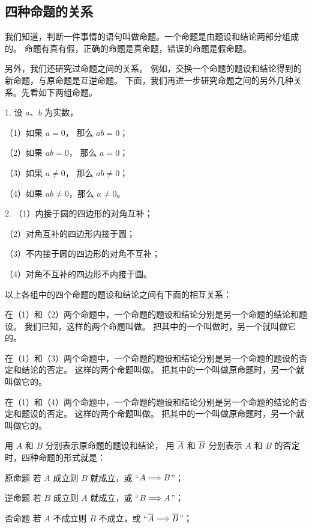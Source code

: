 \subsection{四种命题的关系}\label{subsec:czjh2-7-21}

我们知道，判断一件事情的语句叫做命题。一个命题是由题设和结论两部分组成的。
命题有真有假，正确的命题是真命题，错误的命题是假命题。

另外，我们还研究过命题之间的关系。
例如，交换一个命题的题设和结论得到的新命题，与原命题是互逆命题。
下面，我们再进一步研究命题之间的另外几种关系。先看如下两组命题。

1. 设 $a$、$b$ 为实数，

\quad（1）如果 $a=0$， 那么 $ab = 0$；

\quad（2）如果 $ab = 0$， 那么 $a = 0$；

\quad（3）如果 $a \neq 0$， 那么 $ab \neq 0$；

\quad（4）如果 $ab \neq 0$，那么 $a \neq 0$。

2. （1）内接于圆的四边形的对角互补；

\quad（2）对角互补的四边形内接于圆；

\quad（3）不内接于圆的四边形的对角不互补；

\quad（4）对角不互补的四边形不内接于圆。

以上各组中的四个命题的题设和结论之间有下面的相互关系：

在（1）和（2）两个命题中，一个命题的题设和结论分别是另一个命题的结论和题设。
我们已知，这样的两个命题叫做。
把其中的一个叫做时，另一个就叫做它的。

在（1）和（3）两个命题中，一个命题的题设和结论分别是另一个命题的题设的否定和结论的否定。
这样的两个命题叫做。
把其中的一个叫做原命题时，另一个就叫做它的。

在（1）和（4）两个命题中，一个命题的题设和结论分别是另一个命题的结论的否定和题设的否定。
这样的两个命题叫做。
把其中的一个叫做原命题时，另一个就叫做它的。

用 $A$ 和 $B$ 分别表示原命题的题设和结论， 用 $\overline{A}$ 和 $\overline{B}$
分别表示 $A$ 和 $B$ 的否定时，四种命题的形式就是：

原命题 \quad 若 $A$ 成立则 $B$ 就成立，或 “$A \Longrightarrow B$”；

逆命题 \quad 若 $B$ 成立则 $A$ 就成立，或 “$B \Longrightarrow A$”；

否命题 \quad 若 $A$ 不成立则 $B$ 不成立，或 “$\overline{A} \Longrightarrow \overline{B}$”；

